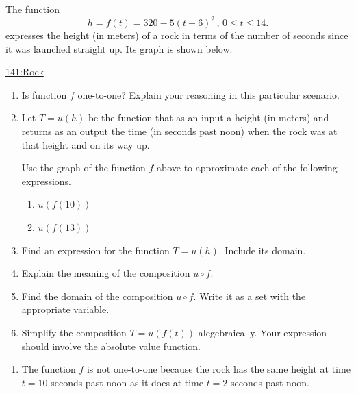 \documentclass{ximera}
\begin{document}
\begin{example}\label{Qpfef3z}
The function
\[
  h = f(t) = 320 - 5(t-6)^2 \, , \, 0\leq t \leq 14.
\]
expresses the height (in meters) of a rock in terms of the number of seconds since it was launched straight up. Its graph is shown below.

 
\begin{onlineOnly}
    \begin{center}
\end{center}
\end{onlineOnly}

\href{https://www.desmos.com/calculator/ew9jsipj5z}{141:Rock}

\begin{enumerate}
\item Is function $f$ one-to-one? Explain your reasoning in this particular scenario.

\item Let  $T=u(h)$ be the function that as an input a height (in meters) and returns as an output the time (in seconds past noon) when the rock was at that height and on its way up. 

Use the graph of the function $f$ above to approximate each of the following expressions.

\begin{enumerate}

\item $u(f(10))$

\item $u(f(13))$
\end{enumerate}

\item Find an expression for the function $T=u(h)$. Include its domain.

\item Explain the meaning of the composition $u\circ f$.

\item Find the domain of the composition $u\circ f$. Write it as a set with the appropriate variable.


\item Simplify the composition $T=u(f(t))$ alegebraically. Your expression should involve the absolute value function. %
\end{enumerate}

\begin{explanation}
\begin{enumerate}
\item The function $f$ is not one-to-one because the rock has the same height at time $t=10$ seconds past noon as it does at time $t=2$ seconds past noon.


\end{enumerate}
\end{explanation}
\end{example}
\end{document}
